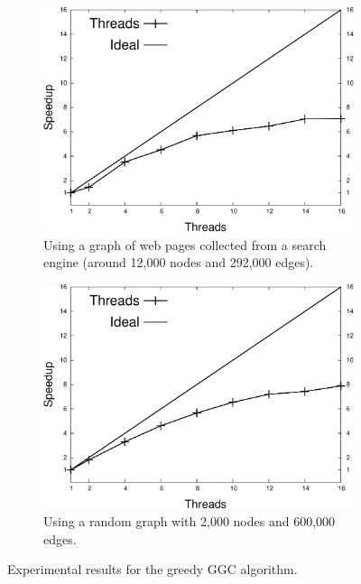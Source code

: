\begin{figure}[h]
   \centering
   \begin{subfigure}[b]{0.40\textwidth}
      \includegraphics[width=\textwidth]{speedup_greedy-graph-coloring-search_engines.pdf}
      \caption{Using a graph of web pages collected from a search engine (around 12,000 nodes and 292,000 edges).}
   \end{subfigure}
   \begin{subfigure}[b]{0.40\textwidth}
      \includegraphics[width=\textwidth]{speedup_greedy-graph-coloring-2000.pdf}
      \caption{Using a random graph with 2,000 nodes and 600,000 edges.\newline}
   \end{subfigure}
   \caption{Experimental results for the greedy GGC algorithm.}
   \label{exp:graph_coloring}
\end{figure}

